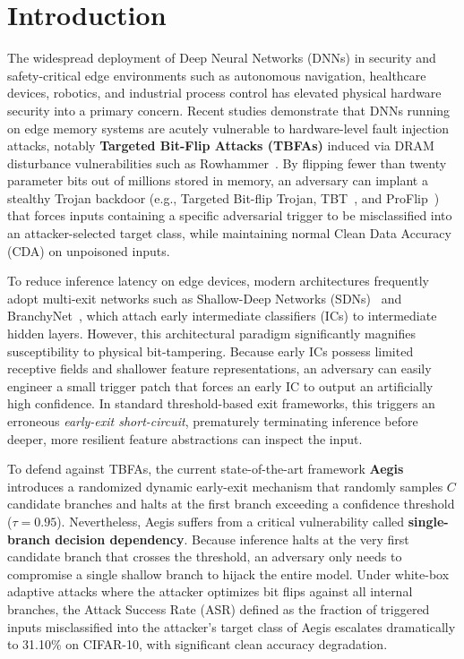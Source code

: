 \documentclass[conference,10pt]{IEEEtran}
\begin{document}
\section{Introduction}
The widespread deployment of Deep Neural Networks (DNNs) in security and safety-critical edge environments such as autonomous navigation, healthcare devices, robotics, and industrial process control has elevated physical hardware security into a primary concern. Recent studies demonstrate that DNNs running on edge memory systems are acutely vulnerable to hardware-level fault injection attacks, notably \textbf{Targeted Bit-Flip Attacks (TBFAs)} induced via DRAM disturbance vulnerabilities such as Rowhammer~\cite{kim2014rowhammer}. By flipping fewer than twenty parameter bits out of millions stored in memory, an adversary can implant a stealthy Trojan backdoor (e.g., Targeted Bit-flip Trojan, TBT~\cite{rakin2020tbt}, and ProFlip~\cite{chen2021proflip}) that forces inputs containing a specific adversarial trigger to be misclassified into an attacker-selected target class, while maintaining normal Clean Data Accuracy (CDA) on unpoisoned inputs.

To reduce inference latency on edge devices, modern architectures frequently adopt multi-exit networks such as Shallow-Deep Networks (SDNs)~\cite{kaya2019sdn} and BranchyNet~\cite{teerapittayanon2016branchynet}, which attach early intermediate classifiers (ICs) to intermediate hidden layers. However, this architectural paradigm significantly magnifies susceptibility to physical bit-tampering. Because early ICs possess limited receptive fields and shallower feature representations, an adversary can easily engineer a small trigger patch that forces an early IC to output an artificially high confidence. In standard threshold-based exit frameworks, this triggers an erroneous \textit{early-exit short-circuit}, prematurely terminating inference before deeper, more resilient feature abstractions can inspect the input.

To defend against TBFAs, the current state-of-the-art framework \textbf{Aegis}~\cite{wang2023aegis} introduces a randomized dynamic early-exit mechanism that randomly samples $C$ candidate branches and halts at the first branch exceeding a confidence threshold ($\tau = 0.95$). Nevertheless, Aegis suffers from a critical vulnerability called \textbf{single-branch decision dependency}. Because inference halts at the very first candidate branch that crosses the threshold, an adversary only needs to compromise a single shallow branch to hijack the entire model. Under white-box adaptive attacks where the attacker optimizes bit flips against all internal branches, the Attack Success Rate (ASR) defined as the fraction of triggered inputs misclassified into the attacker's target class of Aegis escalates dramatically to 31.10\% on CIFAR-10, with significant clean accuracy degradation.
\end{document}
